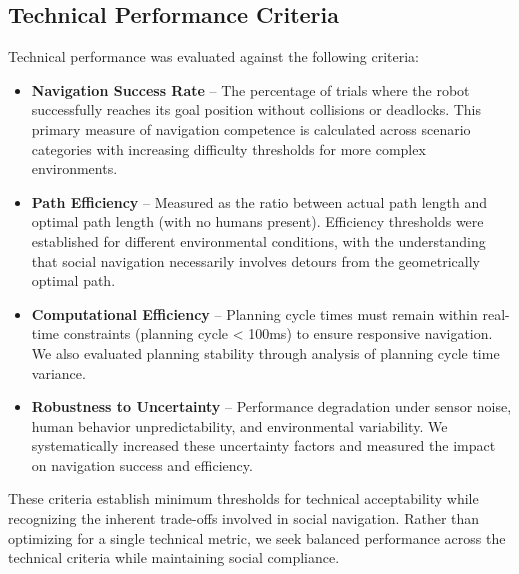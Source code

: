 
\subsection{Technical Performance Criteria}
\label{subsec:technical_performance}
Technical performance was evaluated against the following criteria:
\begin{itemize}
    \item \textbf{Navigation Success Rate} -- The percentage of trials where the robot 
    successfully reaches its goal position without collisions or deadlocks. This primary
     measure of navigation competence is calculated across scenario categories with 
     increasing difficulty thresholds for more complex environments.
    \item \textbf{Path Efficiency} -- Measured as the ratio between actual path length 
    and optimal path length (with no humans present). Efficiency thresholds were 
    established for different environmental conditions, with the understanding that 
    social navigation necessarily involves detours from the geometrically optimal path.
    \item \textbf{Computational Efficiency} -- Planning cycle times must remain within 
    real-time constraints (planning cycle < 100ms) to ensure responsive navigation. We 
    also evaluated planning stability through analysis of planning cycle time variance.
    \item \textbf{Robustness to Uncertainty} -- Performance degradation under sensor 
    noise, human behavior unpredictability, and environmental variability. We systematically 
    increased these uncertainty factors and measured the impact on navigation success 
    and efficiency.
\end{itemize}
These criteria establish minimum thresholds for technical acceptability while recognizing 
the inherent trade-offs involved in social navigation. Rather than optimizing for a single 
technical metric, we seek balanced performance across the technical criteria while 
maintaining social compliance.



